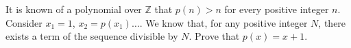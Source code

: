 It is known of a polynomial over $\mathbb{Z}$ that $p(n) > n$ for every positive integer $n$. Consider $x_1 = 1$, $x_2 = p(x_1) \ldots$. We know that, for any positive integer $N$, there exists a term of the sequence divisible by $N$. Prove that $p(x) = x + 1$.
